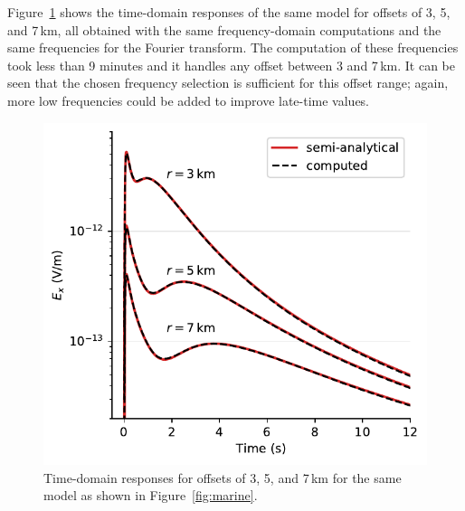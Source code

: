 \documentclass[extra, camera,%
    onecolumn,   %
    referee,     %
]{gji}
\newlength{\cwidth}
\begin{document}
Figure~\ref{fig:marine-multioffset} shows the time-domain responses of the same
model for offsets of 3, 5, and 7\,km, all obtained with the same
frequency-domain computations and the same frequencies for the Fourier
transform. The computation of these frequencies took less than 9 minutes and it
handles any offset between 3 and 7\,km. It can be seen that the chosen
frequency selection is sufficient for this offset range; again, more low
frequencies could be added to improve late-time values.
%
\begin{figure}
  \centering
  \includegraphics[width=\cwidth]{07-marine-multioffset}
  \caption{Time-domain responses for offsets of 3, 5, and 7\,km for the same
    model as shown in Figure~\ref{fig:marine}.}
  \label{fig:marine-multioffset}
\end{figure}
%


\subsection{} %


\end{document}
